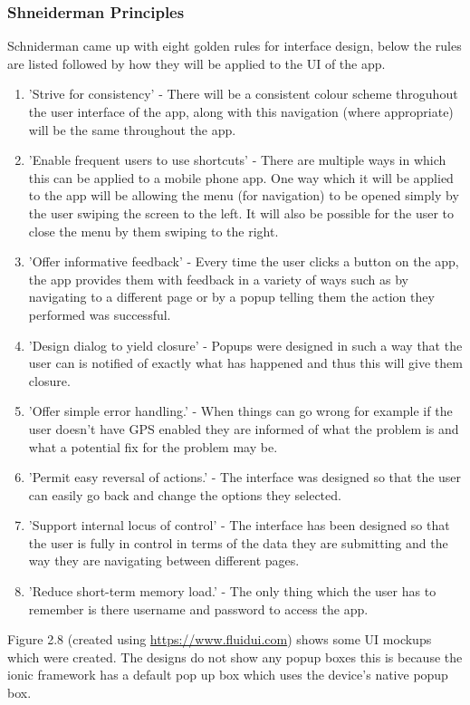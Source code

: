 \subsubsection{Shneiderman Principles}
Schniderman came up with eight golden rules for interface design, below the rules are listed followed by how they will be applied to the UI of the app. \cite{sch}
\begin{enumerate}
	\item 'Strive for consistency' - There will be a consistent colour scheme throguhout the user interface of the app, along with this navigation (where appropriate) will be the same throughout the app.
	\item 'Enable frequent users to use shortcuts' - There are multiple ways in which this can be applied to a mobile phone app. One way which it will be applied to the app will be allowing the menu (for navigation) to be opened simply by the user swiping the screen to the left. It will also be possible for the user to close the menu by them swiping to the right.
	\item 'Offer informative feedback' - Every time the user clicks a button on the app, the app provides them with feedback in a variety of ways such as by navigating to a different page or by a popup telling them the action they performed was successful.
	\item 'Design dialog to yield closure' - Popups were designed in such a way that the user can is notified of exactly what has happened and thus this will give them closure.
	\item 'Offer simple error handling.' - When things can go wrong for example if the user doesn't have GPS enabled they are informed of what the problem is and what a potential fix for the problem may be.
	\item 'Permit easy reversal of actions.' - The interface was designed so that the user can easily go back and change the options they selected.
	\item 'Support internal locus of control' - The interface has been designed so that the user is fully in control in terms of the data they are submitting and the way they are navigating between different pages.
	\item 'Reduce short-term memory load.' - The only thing which the user has to remember is there username and password to access the app.
\end{enumerate}
Figure 2.8 (created using \url {https://www.fluidui.com}) shows some UI mockups which were created. The designs do not show any popup boxes this is because the ionic framework has a default pop up box which uses the device's native popup box.
